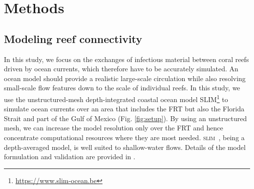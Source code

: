 \documentclass[utf8]{frontiersSCNS}
\newcommand{\slim}{\textsc{slim}\ }
\newcommand{\dan}[1]{\textbf{\textcolor{orange}{#1}}}
\begin{document}
\section{Methods}

\subsection{Modeling reef connectivity}
In this study, we focus on the exchanges of infectious material between coral reefs driven by ocean currents, which therefore have to be accurately simulated. An ocean model should provide a realistic large-scale circulation while also resolving small-scale flow features down to the scale of individual reefs. In this study, we use the unstructured-mesh depth-integrated coastal ocean model SLIM\footnote{\url{https://www.slim-ocean.be}} to simulate ocean currents over an area that includes the FRT but also the Florida Strait and part of the Gulf of Mexico (Fig. \ref{fig:setup}). By using an unstructured mesh, we can increase the model resolution only over the FRT and hence concentrate computational resources where they are most needed. \slim, being a depth-averaged model, is well suited to shallow-water flows. %
Details of the model formulation and validation are provided in \cite{frys20}. 
\end{document}
